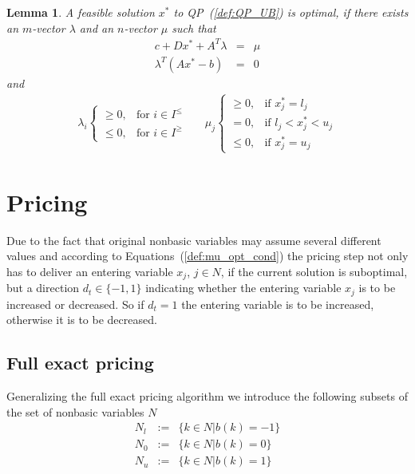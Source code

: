 \documentclass[a4paper]{article}
\newtheorem{lemma}{Lemma}
\begin{document}
\begin{lemma}
A feasible solution $x^{*}$ to QP~(\ref{def:QP_UB}) is optimal, if there exists an $m$-vector $\lambda$ and an $n$-vector $\mu$ such that 
\begin{eqnarray}
c + Dx^{*} +A^{T}\lambda
&=&
\mu  \\
\lambda^{T}\left(Ax^{*}-b\right)
&=&
0
\end{eqnarray}
and
\begin{eqnarray}
\label{def:mu_opt_cond}
\lambda_{i} \left\{
\begin{array}{ll}
\geq 0, & \text{for $i \in I^{\leq}$} \\
\leq 0, & \text{for $i \in I^{\geq}$}
\end{array}
\right.
&&
\mu_{j} \left\{
\begin{array}{ll}
\geq 0, & \text{if $x_{j}^{*}=l_{j}$} \\
= 0,    & \text{if $l_{j} < x_{j}^{*} < u_{j}$} \\
\leq 0, & \text{if $x_{j}^{*}=u_{j}$}
\end{array}
\right.
\end{eqnarray}
\end{lemma}

\section{Pricing}
Due to the fact that original nonbasic variables may assume several different values and according to Equations~(\ref{def:mu_opt_cond}) the pricing step not only has to deliver an entering variable $x_{j}$, $j \in N$, if the current solution is suboptimal, but a direction $d_{t} \in \{-1,1\}$ indicating whether the entering variable $x_{j}$ is to be increased or decreased. So if $d_{t}=1$ the entering variable is to be increased, otherwise it is to be decreased.

\subsection{Full exact pricing}
Generalizing the full exact pricing algorithm we introduce the following subsets of the set of nonbasic variables $N$
\begin{eqnarray}
N_{l}&:=&\{k \in N\left|\right. b\left(k\right)=-1\} \\
N_{0}&:=&\{k \in N\left|\right. b\left(k\right)=0\} \\
N_{u}&:=&\{k \in N\left|\right. b\left(k\right)=1\}
\end{eqnarray}
\end{document}
